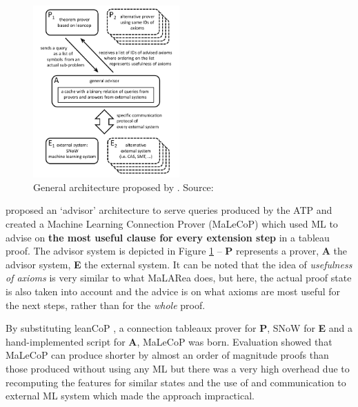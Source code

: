 \documentclass{article}
\begin{document}
\begin{figure}[t]
    \centering
    \includegraphics[width=0.5\textwidth]{malecop_arch.png}
    \caption{General architecture proposed by \cite{malecop}. Source: \cite{malecop}}
    \label{fig:malecop}
\end{figure}

\cite{malecop} proposed an `advisor' architecture to serve queries produced by
the ATP and created a Machine Learning Connection Prover (MaLeCoP) which used
ML to advise on \textbf{the most useful clause for every extension step} in
a tableau proof. The advisor system is depicted in Figure \ref{fig:malecop} --
\textbf{P} represents a prover, \textbf{A} the advisor system, \textbf{E} the
external system. It can be noted that the idea of \emph{usefulness of axioms}
is very similar to what MaLARea does, but here, the actual proof state is also
taken into account and the advice is on what axioms are most useful for the
next steps, rather than for the \emph{whole} proof.

By substituting leanCoP \citep{leancop}, a connection tableaux prover for
\textbf{P}, SNoW \citep{SNoW} for \textbf{E} and a hand-implemented script for
\textbf{A}, MaLeCoP was born. Evaluation showed that MaLeCoP can produce
shorter by almost an order of magnitude proofs than those produced without
using any ML but there was a very high overhead due to recomputing the features
for similar states and the use of and communication to external ML system which
made the approach impractical.
\end{document}
